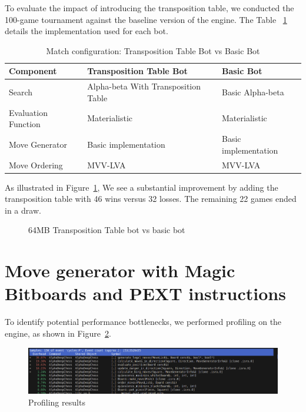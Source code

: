 \noindent To evaluate the impact of introducing the transposition table, we conducted the 100-game tournament against the baseline version of the engine. The Table ~\ref{tab:tt_vs_basic} details the implementation used for each bot.

\begin{table}[H]
    \centering
    \begin{tabular}{|p{4cm}|p{4cm}|p{4cm}|}
    \hline
    \textbf{Component}         & \textbf{Transposition Table Bot}  & \textbf{Basic Bot}     \\ \hline
    Search                     & Alpha-beta With Transposition Table          & Basic Alpha-beta           \\ \hline
    Evaluation Function        & Materialistic                      & Materialistic       \\ \hline
    Move Generator             & Basic implementation              & Basic implementation   \\ \hline
    Move Ordering              & MVV-LVA                           & MVV-LVA                \\ \hline
    \end{tabular}
    \caption{Match configuration: Transposition Table Bot vs Basic Bot}
    \label{tab:tt_vs_basic}
\end{table}

\noindent As illustrated in Figure~\ref{fig:results_transposition_table_bot}, We see a substantial improvement by adding the transposition table with 46 wins versus 32 losses. The remaining 22 games ended in a draw.

\begin{center}
\begin{figure}[H]
    \centering
    \caption{64MB Transposition Table bot vs basic bot}
    \label{fig:results_transposition_table_bot}
\end{figure}
\medskip
\end{center}

\section{Move generator with Magic Bitboards and PEXT instructions}

To identify potential performance bottlenecks, we performed profiling on the engine, as shown in Figure~\ref{fig:profiling}.

\begin{center}
    \begin{figure}[H]
    \centering
        \includegraphics[width=1.0\textwidth]{Imagenes/basic_move_generator_profiling.png}
        \caption{Profiling results}
        \label{fig:profiling}
    \end{figure}
    \medskip
\end{center}

